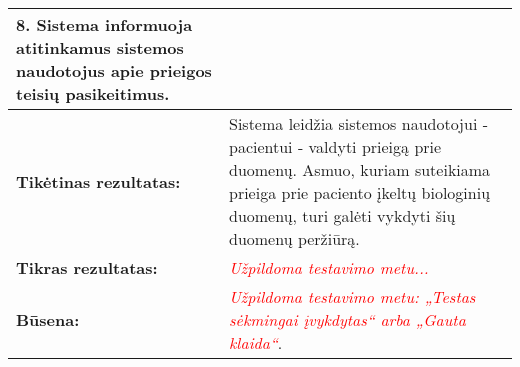\documentclass[12pt]{article}
\begin{document}
\begin{table}[htb!]
\begin{tabular}{|m{6cm}|m{11cm}|}
{{            \textbf{8.} {Sistema informuoja atitinkamus sistemos naudotojus apie
            prieigos teisių pasikeitimus.}
        }} \\
        \hline
        \raggedleft \textbf{\cellcolor{deepchampagne}Tikėtinas rezultatas:}
        & Sistema leidžia sistemos naudotojui - pacientui - valdyti prieigą prie
        duomenų. Asmuo, kuriam suteikiama prieiga prie paciento įkeltų
        biologinių duomenų, turi galėti vykdyti šių duomenų peržiūrą. \\
        \hline
        \raggedleft \textbf{\cellcolor{deepchampagne}Tikras rezultatas:}
        & \textcolor{red}{\emph{Užpildoma testavimo metu...}} \\
        \hline
        \raggedleft \textbf{\cellcolor{deepchampagne}Būsena:}
        & \textcolor{red}{\emph{Užpildoma testavimo metu: „Testas sėkmingai
        įvykdytas“ arba „Gauta klaida“}}. \\
        \hline
    \end{tabular}
    \label{table:TS_3}
\end{table}

\newpage
\end{document}
